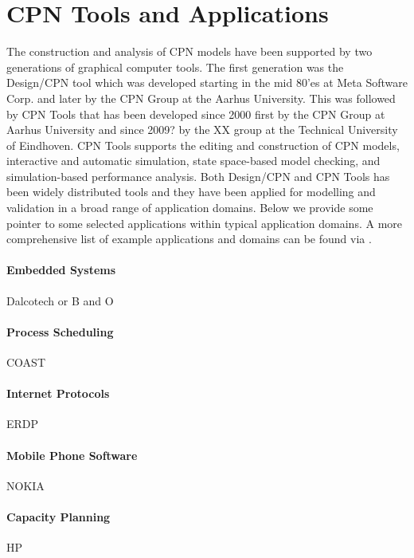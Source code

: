 
\section{CPN Tools and Applications}

The construction and analysis of CPN models have been supported by two
generations of graphical computer tools. The first generation was the
Design/CPN tool \cite{X} which was developed starting in the mid 80'es
at Meta Software Corp. and later by the CPN Group at the Aarhus
University. This was followed by CPN Tools \cite{Y} that has been
developed since 2000 first by the CPN Group at Aarhus University and
since 2009? by the XX group at the Technical University of
Eindhoven. CPN Tools supports the editing and construction of CPN
models, interactive and automatic simulation, state space-based model
checking, and simulation-based performance analysis. Both Design/CPN
and CPN Tools has been widely distributed tools and they have been
applied for modelling and validation in a broad range of application
domains. Below we provide some pointer to some selected applications
within typical application domains. A more comprehensive list of
example applications and domains can be found via \cite{X}.

\paragraph{Embedded Systems} Dalcotech or B and O

\paragraph{Process Scheduling} COAST

\paragraph{Internet Protocols} ERDP

\paragraph{Mobile Phone Software} NOKIA

\paragraph{Capacity Planning} HP

